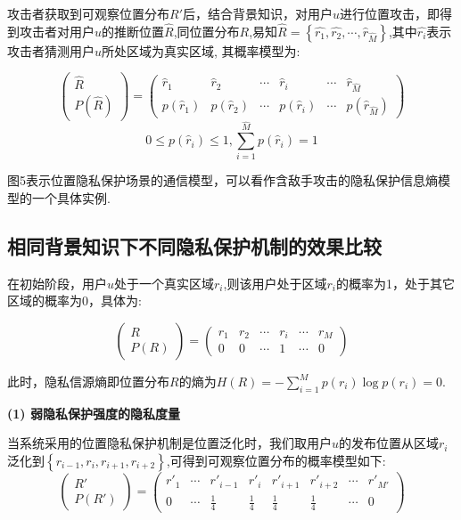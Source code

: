 攻击者获取到可观察位置分布$R{}'$后，结合背景知识，对用户$u$进行位置攻击，即得到攻击者对用户$u$的推断位置$\hat{R}$,同位置分布$R$,易知$\hat{R}=\left \{ \hat{r_{1}},\hat{r_{2}},\cdots ,\hat{r}_{\hat{M}} \right \}$,其中$\hat{r_{i}}$表示攻击者猜测用户$u$所处区域为真实区域, 其概率模型为:

\begin{equation*}
\begin{pmatrix}
\hat{R}\\ 
P(\hat{R})
\end{pmatrix}=\begin{pmatrix}
\hat{r}_{1} & \hat{r}_{2} & \cdots  & \hat{r}_{i} & \cdots  & \hat{r}_{\hat{M}}\\ 
p(\hat{r}_{1})& p(\hat{r}_{2}) & \cdots & p(\hat{r}_{i}) & \cdots & p(\hat{r}_{\hat{M}})
\end{pmatrix}
\end{equation*}
\begin{equation*}
0\leq p(\hat{r}_{i})\leq 1,\sum_{i=1}^{\hat{M}}p(\hat{r}_{i})=1
\end{equation*}

图5表示位置隐私保护场景的通信模型，可以看作含敌手攻击的隐私保护信息熵模型的一个具体实例.


\subsection{相同背景知识下不同隐私保护机制的效果比较}\label{4.2}

在初始阶段，用户$u$处于一个真实区域$r_{i}$,则该用户处于区域$r_{i}$的概率为1，处于其它区域的概率为0，具体为:

\begin{equation*}
\begin{pmatrix}
R\\ 
P(R)
\end{pmatrix}=\begin{pmatrix}
r_{1} & r_{2} & \cdots  & r_{i} & \cdots  & r_{M}\\ 
0 & 0 & \cdots  & 1 & \cdots  & 0
\end{pmatrix}
\end{equation*}

此时，隐私信源熵即位置分布$R$的熵为$H(R)=-\sum_{i=1}^{M}p(r_{i})\log p(r_{i})=0$.

\textbf{(1) 弱隐私保护强度的隐私度量}

当系统采用的位置隐私保护机制是位置泛化时，我们取用户$u$的发布位置从区域$r_{i}$泛化到$\left \{ r_{i-1},r_{i},r_{i+1},r_{i+2} \right \}$,可得到可观察位置分布的概率模型如下:
\begin{equation*}
\begin{pmatrix}
{R}'\\ 
P({R}')
\end{pmatrix}=\begin{pmatrix}
{r}'_{1} & \cdots  & {r}'_{i-1} & {r}'_{i} & {r}'_{i+1}  & {r}'_{i+2} & \cdots & {r}'_{{M}'} \\ 
0 & \cdots & \frac{1}{4} & \frac{1}{4} & \frac{1}{4}  & \frac{1}{4} & \cdots & 0
\end{pmatrix}
\end{equation*}

